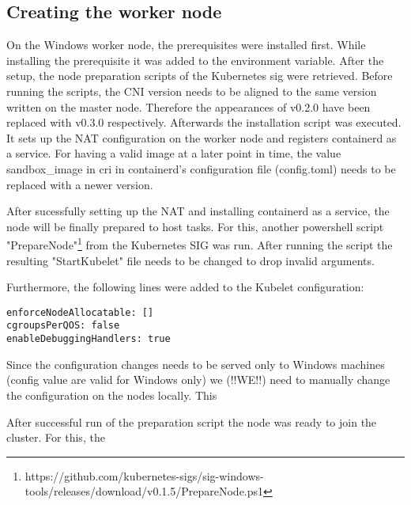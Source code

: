 \subsection{Creating the worker node}
On the Windows worker node, the prerequisites were installed first. While installing the prerequisite  it was added to the  environment variable. After the setup, the node preparation scripts of the Kubernetes \ac{sig} were retrieved. Before running the scripts, the \ac{CNI} version needs to be aligned to the same version written on the master node. Therefore the appearances of v0.2.0 have been replaced with v0.3.0 respectively.
Afterwards the installation script was executed. It sets up the \ac{NAT} configuration on the worker node and registers containerd as a service.
For having a valid image at a later point in time, the value sandbox\_image in cri in containerd's configuration file (config.toml) needs to be replaced with a newer version.

After sucessfully setting up the \ac{NAT} and installing containerd as a service, the node will be finally prepared to host tasks. For this, another powershell script "PrepareNode"\footnote{https://github.com/kubernetes-sigs/sig-windows-tools/releases/download/v0.1.5/PrepareNode.ps1} from the Kubernetes \ac{SIG} was run. After running the script the resulting "StartKubelet" file needs to be changed to drop invalid arguments.

Furthermore, the following lines were added to the Kubelet configuration:
\begin{lstlisting}
enforceNodeAllocatable: []
cgroupsPerQOS: false
enableDebuggingHandlers: true
\end{lstlisting}
Since the configuration changes needs to be served only to Windows machines (config value are valid for Windows only) we (!!WE!!) need to manually change the configuration on the nodes locally. This


After successful run of the preparation script the node was ready to join the cluster. For this, the 


